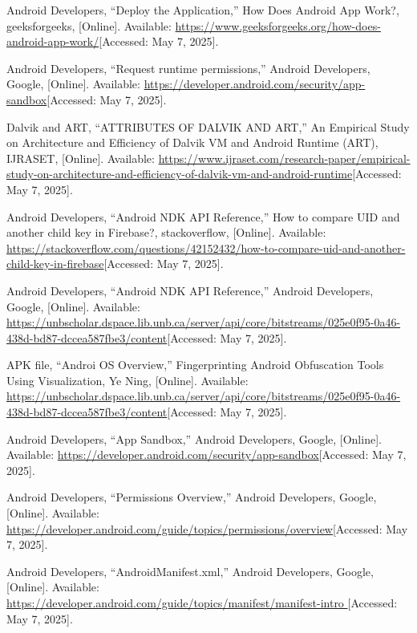 \documentclass[12pt]{report}
\begin{document}
\begin{thebibliography}{1}
  Android Developers, “Deploy the Application,” How Does Android App Work?, geeksforgeeks, [Online]. Available: \url{https://www.geeksforgeeks.org/how-does-android-app-work/}[Accessed: May 7, 2025].

  Android Developers, “Request runtime permissions,” Android Developers, Google, [Online]. Available: \url{https://developer.android.com/security/app-sandbox}[Accessed: May 7, 2025].
 
  Dalvik and ART, “ATTRIBUTES OF DALVIK AND ART,” An Empirical Study on Architecture and Efficiency of Dalvik VM and Android Runtime (ART), IJRASET, [Online]. Available: \url{https://www.ijraset.com/research-paper/empirical-study-on-architecture-and-efficiency-of-dalvik-vm-and-android-runtime}[Accessed: May 7, 2025].

  Android Developers, “Android NDK API Reference,” How to compare UID and another child key in Firebase?, stackoverflow, [Online]. Available: \url{https://stackoverflow.com/questions/42152432/how-to-compare-uid-and-another-child-key-in-firebase}[Accessed: May 7, 2025].

  Android Developers, “Android NDK API Reference,” Android Developers, Google, [Online]. Available: \url{https://unbscholar.dspace.lib.unb.ca/server/api/core/bitstreams/025e0f95-0a46-438d-bd87-dccea587fbe3/content}[Accessed: May 7, 2025].

  APK file, “Androi OS Overview,” Fingerprinting Android Obfuscation Tools Using Visualization, Ye Ning, [Online]. Available: \url{https://unbscholar.dspace.lib.unb.ca/server/api/core/bitstreams/025e0f95-0a46-438d-bd87-dccea587fbe3/content}[Accessed: May 7, 2025].

  Android Developers, “App Sandbox,” Android Developers, Google, [Online]. Available: \url{https://developer.android.com/security/app-sandbox}[Accessed: May 7, 2025].
  
  Android Developers, “Permissions Overview,” Android Developers, Google, [Online]. Available: \url{https://developer.android.com/guide/topics/permissions/overview}[Accessed: May 7, 2025].
  
  Android Developers, “AndroidManifest.xml,” Android Developers, Google, [Online]. Available: \url{https://developer.android.com/guide/topics/manifest/manifest-intro }[Accessed: May 7, 2025].
   

\end{thebibliography}
\end{document}
